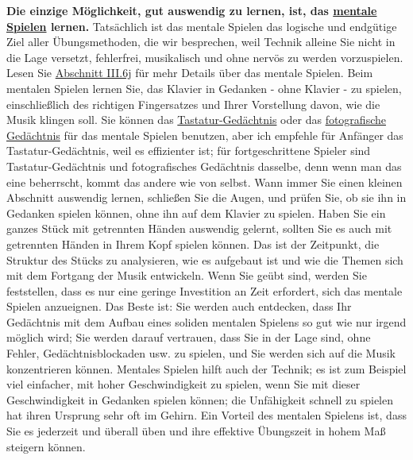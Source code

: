 \textbf{Die einzige Möglichkeit, gut auswendig zu lernen, ist, das \hyperlink{c1iii6tastatur}{mentale Spielen} lernen.}
Tatsächlich ist das mentale Spielen das logische und endgütige Ziel aller Übungsmethoden, die wir besprechen, weil Technik alleine Sie nicht in die Lage versetzt, fehlerfrei, musikalisch und ohne nervös zu werden vorzuspielen.
Lesen Sie \hyperlink{c1iii6j}{Abschnitt III.6j} für mehr Details über das mentale Spielen.
Beim mentalen Spielen lernen Sie, das Klavier in Gedanken - ohne Klavier - zu spielen, einschließlich des richtigen Fingersatzes und Ihrer Vorstellung davon, wie die Musik klingen soll.
Sie können das \hyperlink{c1iii6tastatur}{Tastatur-Gedächtnis} oder das \hyperlink{c1iii6foto}{fotografische Gedächtnis} für das mentale Spielen benutzen, aber ich empfehle für Anfänger das Tastatur-Gedächtnis, weil es effizienter ist;
für fortgeschrittene Spieler sind Tastatur-Gedächtnis und  fotografisches Gedächtnis dasselbe, denn wenn man das eine beherrscht, kommt das andere wie von selbst.
Wann immer Sie einen kleinen Abschnitt auswendig lernen, schließen Sie die Augen, und prüfen Sie, ob sie ihn in Gedanken spielen können, ohne ihn auf dem Klavier zu spielen.
Haben Sie ein ganzes Stück mit getrennten Händen auswendig gelernt, sollten Sie es auch mit getrennten Händen in Ihrem Kopf spielen können.
Das ist der Zeitpunkt, die Struktur des Stücks zu analysieren, wie es aufgebaut ist und wie die Themen sich mit dem Fortgang der Musik entwickeln.
Wenn Sie geübt sind, werden Sie feststellen, dass es nur eine geringe Investition an Zeit erfordert, sich das mentale Spielen anzueignen.
Das Beste ist: Sie werden auch entdecken, dass Ihr Gedächtnis mit dem Aufbau eines soliden mentalen Spielens so gut wie nur irgend möglich wird; Sie werden darauf vertrauen, dass Sie in der Lage sind, ohne Fehler, Gedächtnisblockaden usw. zu spielen, und Sie werden sich auf die Musik konzentrieren können.
Mentales Spielen hilft auch der Technik; es ist zum Beispiel viel einfacher, mit hoher Geschwindigkeit zu spielen, wenn Sie mit dieser Geschwindigkeit in Gedanken spielen können; die Unfähigkeit schnell zu spielen hat ihren Ursprung sehr oft im Gehirn.
Ein Vorteil des mentalen Spielens ist, dass Sie es jederzeit und überall üben und ihre effektive Übungszeit in hohem Maß steigern können.

